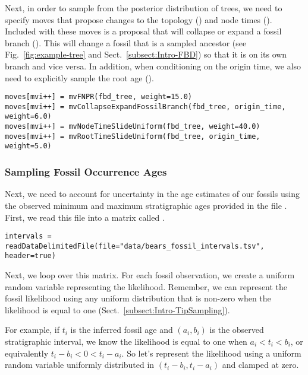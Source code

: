 Next, in order to sample from the posterior distribution of trees, we need to specify moves that propose changes to the topology () and node times ().
Included with these moves is a proposal that will collapse or expand a fossil branch ().
This will change a fossil that is a sampled ancestor (see Fig.\ \ref{fig:example-tree} and Sect.\ \ref{subsect:Intro-FBD}) so that it is on its own branch and vice versa.
In addition, when conditioning on the origin time, we also need to explicitly sample the root age ().
{\tt \begin{snugshade*}
\begin{lstlisting}
moves[mvi++] = mvFNPR(fbd_tree, weight=15.0)
moves[mvi++] = mvCollapseExpandFossilBranch(fbd_tree, origin_time, weight=6.0)
moves[mvi++] = mvNodeTimeSlideUniform(fbd_tree, weight=40.0)
moves[mvi++] = mvRootTimeSlideUniform(fbd_tree, origin_time, weight=5.0)
\end{lstlisting}
\end{snugshade*}}

\subsubsection{Sampling Fossil Occurrence Ages}\label{subsub:Exercise-FBD-TipSampling}

Next, we need to account for uncertainty in the age estimates of our fossils using the observed minimum and maximum stratigraphic ages provided in the file .
First, we read this file into a matrix called .

{\tt \begin{snugshade*}
\begin{lstlisting}
intervals = readDataDelimitedFile(file="data/bears_fossil_intervals.tsv", header=true)
\end{lstlisting}
\end{snugshade*}}

Next, we loop over this matrix.
For each fossil observation, we create a uniform random variable representing the likelihood.
Remember, we can represent the fossil likelihood using any uniform distribution that is non-zero when the likelihood is equal to one (Sect.\ \ref{subsect:Intro-TipSampling}).

For example, if $t_i$ is the inferred fossil age and $(a_i,b_i)$ is the observed stratigraphic interval, we know the likelihood is equal to one when $a_i < t_i < b_i$, or equivalently $t_i - b_i < 0 < t_i - a_i$.
So let's represent the likelihood using a uniform random variable uniformly distributed in $(t_i - b_i, t_i - a_i)$ and clamped at zero.


